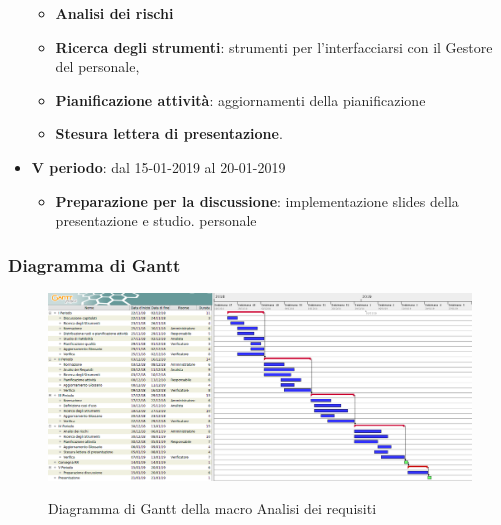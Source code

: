 \begin{itemize}
        	\begin{itemize}
    	        \item \textbf{Analisi dei rischi}
       	        \item \textbf{Ricerca degli strumenti}: strumenti per l'interfacciarsi con il Gestore del personale, 
       	        \item \textbf{Pianificazione attività}: aggiornamenti della pianificazione
       	        \item \textbf{Stesura lettera di presentazione}.
        	\end{itemize}
        	\item \textbf{V periodo}: dal 15-01-2019 al 20-01-2019
        	\begin{itemize}
    	        \item \textbf{Preparazione per la discussione}: implementazione slides della presentazione e studio. personale
        	\end{itemize}
		\end{itemize}
		
            \subsubsection{Diagramma di Gantt}
            
			\begin{figure}[H]
					\centering
					\includegraphics{img/Analisi_dei_Requisiti.png}\\
					\caption{Diagramma di Gantt della macro Analisi dei requisiti}
			\end{figure}


